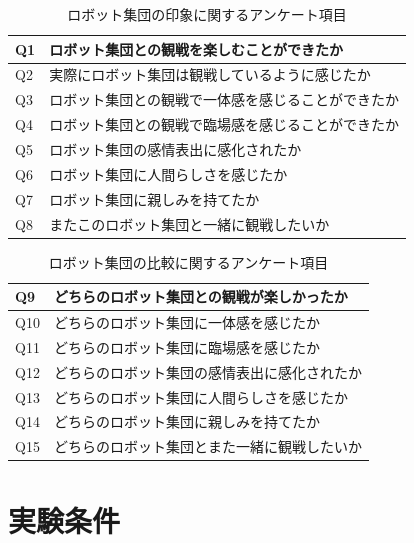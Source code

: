 \begin{table}[!ht]
\caption{ロボット集団の印象に関するアンケート項目}
\label{question1}
\begin{center}
\begin{tabular}{|l||l|}\hline
Q1&ロボット集団との観戦を楽しむことができたか\\ \hline
Q2&実際にロボット集団は観戦しているように感じたか\\ \hline
Q3&ロボット集団との観戦で一体感を感じることができたか\\ \hline
Q4&ロボット集団との観戦で臨場感を感じることができたか\\ \hline
Q5&ロボット集団の感情表出に感化されたか\\ \hline
Q6&ロボット集団に人間らしさを感じたか\\ \hline
Q7&ロボット集団に親しみを持てたか\\ \hline
Q8&またこのロボット集団と一緒に観戦したいか\\ \hline

\end{tabular}
\end{center}
\end{table} 

\begin{table}[!ht]
\caption{ロボット集団の比較に関するアンケート項目}
\label{question2}
\begin{center}
\begin{tabular}{|l||l|}\hline
Q9&どちらのロボット集団との観戦が楽しかったか\\ \hline
Q10&どちらのロボット集団に一体感を感じたか\\ \hline
Q11&どちらのロボット集団に臨場感を感じたか\\ \hline
Q12&どちらのロボット集団の感情表出に感化されたか\\ \hline
Q13&どちらのロボット集団に人間らしさを感じたか\\ \hline
Q14&どちらのロボット集団に親しみを持てたか\\ \hline
Q15&どちらのロボット集団とまた一緒に観戦したいか\\ \hline

\end{tabular}
\end{center}
\end{table} 

\clearpage

\section{実験条件}
\label{sec4.2}

